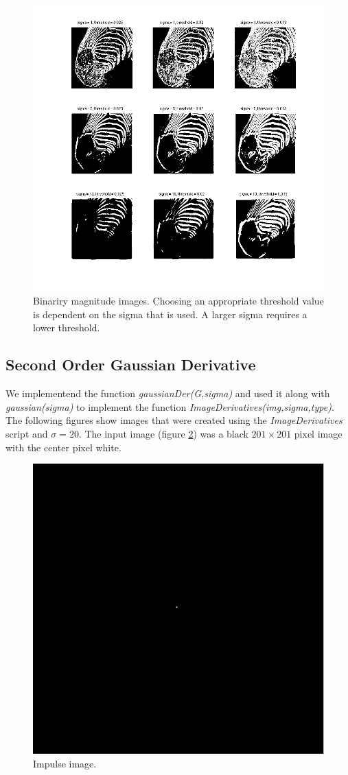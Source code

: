 \documentclass[a4paper]{article}
\begin{document}
\begin{figure}[H]
  \centering
    \includegraphics[width=1 \textwidth]{mag9.png}
  \caption{Binariry magnitude images. Choosing an appropriate threshold value is dependent on the sigma that is used. A larger sigma requires a lower threshold.}
  \label{fig:mag9}
\end{figure}


\subsection{Second Order Gaussian Derivative}
We implementend the function \emph{gaussianDer(G,sigma)} and used it along with \emph{gaussian(sigma)} to implement the function \emph{ImageDerivatives(img,sigma,type)}.
The following figures show images that were created using the \emph{ImageDerivatives} script and $\sigma=20$. The input image (figure \ref{fig:dot}) was a black $201 \times 201$ pixel image with the center pixel white.

\begin{figure}[H]
  \centering
    \includegraphics[width=0.45 \textwidth]{dot.png}
  \caption{Impulse image.}
  \label{fig:dot}
\end{figure}
\end{document}
